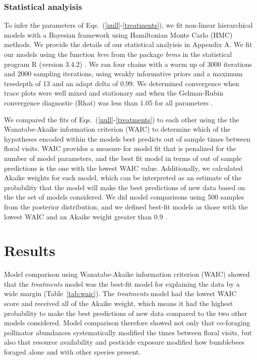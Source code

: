 \begin{refsection}
\subsubsection*{Statistical analyisis}

To  infer the parameters of Eqs.~(\ref{null}-\ref{treatments}), we fit non-linear hierarchical models with a Bayesian framework using Hamiltonian Monte Carlo (HMC) methods. We provide the details of our statistical analyisis in Appendix A. We fit our  models using the function  \textit{brm} from the package \textit{brms} \citep{burkner_advanced_2017} in the statistical program \textsc{R} (version 3.4.2) \citep{Rcore}. We ran four chains with a warm up of 3000 iterations and 2000 sampling iterations, using weakly informative priors and a maximum treedepth of 13 and an adapt delta of $0.99$. We determined convergence when trace plots were well mixed and stationary and when the Gelman-Rubin convergence diagnostic (Rhat) was less than 1.05 for all parameters \citep{vehtari_rank-normalization_2020}.

We compared the fits of  Eqs.~(\ref{null}-\ref{treatments}) to each other using the the Wanatabe-Akaike information criterion (WAIC) to determine which of the hypotheses encoded within the models best predicts out of sample times between floral visits. WAIC provides a measure for model fit that is penalized for the number of model parameters, and the best fit model in terms of out of sample predictions is the one with the lowest WAIC value. Additionally, we calculated Akaike weights for each model, which can be  interpreted as an estimate of the probability that the model will make the best predictions of new data based on the the set of models considered. We did model comparisons using 500 samples from the posterior distribution, and we defined best-fit models as those with the lowest WAIC and an Akaike weight greater than 0.9 \citep{mcelreath_statistical_2018}.

\section*{Results}

Model comparison using Wanatabe-Akaike information criterion (WAIC) showed that the \textit{treatments} model was the best-fit model for explaining the data by a wide margin (Table~\ref{tab:waic}). The \textit{treatments} model had the lowest WAIC score and received all of the Akaike weight, which means it had the highest probability to make the best predictions of new data compared to the two other models considered. Model comparison therefore showed not only that co-foraging pollinator abundances systematically modified the times between floral visits, but also that resource availability and pesticide exposure modified how bumblebees foraged alone and with other species present.


\end{refsection}
